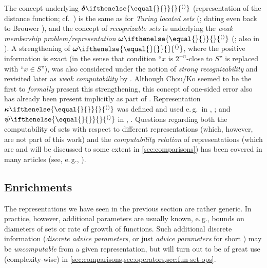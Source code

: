 \documentclass{CSML}
\newcommand{\representation}[2]{ #1\ifnotempty{#2}{^{(#2)}} }
\newcommand{\distrep}[1][\empty]{ \representation{\bm{\delta}}{#1} }
\newcommand{\setrep}[1][\empty]{ \representation{\bm{\psi}}{#1} }
\newcommand{\gridrep}[1][\empty]{ \representation{\bm{\kappa}}{#1} }
\newcommand{\wmemrep}[1][\empty]{ \representation{\bm{\omega}}{#1} }
\newcommand{\ifnotempty}[2]{ \ifthenelse{ \equal{#1}{\empty} }{}{#2} }
\newcommand{\secref}[1]{\S{#1}}
\newcommand{\eg}{\mbox{e.\,g.}\xspace}
\newcommand{\wrt}{with respect to\xspace}
\begin{document}
The concept underlying $\distrep$ (representation of the distance function;
cf.~\cite[$\bm{\psi}^\mathrm{dist}$: Def.~5.1.6]{Weih00}) is the same as for
\emph{Turing located sets} (\cite{ge1994extreme}; dating even back to Brouwer
\cite[\emph{katalogisierte Mengen}]{Brouwer19}),
and the concept of \emph{recognizable sets} \cite[Def.~3.5]{CK95:Rtwo} is
underlying the \emph{weak membership problem/representation} $\wmemrep$
(\cite[Def.~2.1.14]{GLS88}; also in \cite[Def.~4.2]{KuSch95}).
A strengthening of $\wmemrep$, where the positive information is exact
(in the sense that condition ``$x$ is $2^{-n}$-close to $S$'' is replaced
with ``$x \in S$''), was also considered under the notion of \emph{strong
recognizability} \cite[Def.~4.1]{CK95:Rtwo} and revisited later as
\emph{weak computability} by \cite[Def.~3, Thm.~4]{Braverman2005complexity}.
Although Chou/Ko seemed to be the first to \emph{formally} present this
strengthening, this concept of one-sided error also has already been present
implicitly as part of \cite[Lem.~4.3.3]{GLS88}.
Representation $\gridrep$ was defined and used \eg~in
\cite[Def.~5.2.1]{Weih00}, \cite[$\bm{\kappa}_\mathrm{G}$: Def.~2.2]{ZM08};
and $\setrep$ in \cite[$\setrep$: Def.~5.1.1]{Weih00},
\cite[$\bm{\psi}_\varocircle$: \secref{2.2.3}]{KawamuraCook}.
%
Questions regarding both the computability of sets \wrt different
representations (which, however, are not part of this work) and the
\emph{computability relation} of representations (which are and will be
discussed to some extent in \cref{sec:comparisons}) has been covered in many
articles (see, \eg,
\cite{BW99,Weih00,Ziegler02,Hertling02,BrattkaPresser}).


\subsection{Enrichments}
	\label{subsec:enrichments}


The representations we have seen in the previous section are rather generic.
In practice, however, additional parameters are usually known, \eg, bounds on
diameters of sets or rate of growth of functions.
Such additional discrete information (\emph{discrete advice parameters}, or
just \emph{advice parameters} for short \cite[p.18]{KMRZarXiv}) may be
\emph{uncomputable} from a given representation, but will turn out to be of
great use (complexity-wise) in
\cref{sec:comparisons,sec:operators,sec:fun-set-ops}.
\end{document}
